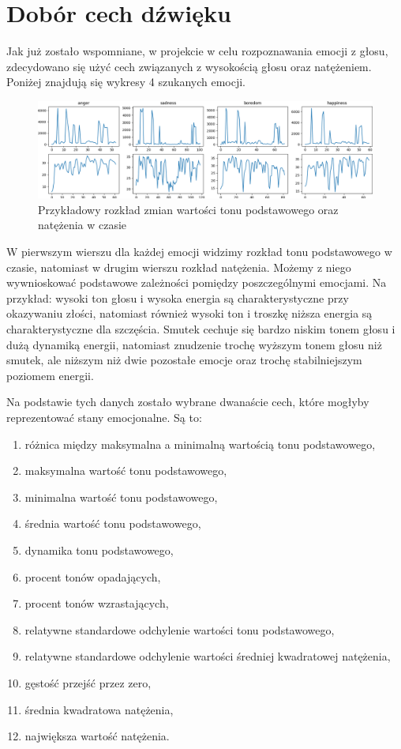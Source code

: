 \documentclass[declaration,shortabstract]{iithesis}
\begin{document}
\section{Dobór cech dźwięku}
Jak już zostało wspomniane, w projekcie w celu rozpoznawania emocji z głosu, zdecydowano się użyć cech związanych z wysokością głosu oraz natężeniem. Poniżej znajdują się wykresy 4 szukanych emocji.

\begin{figure}[!ht]
\hspace*{-2cm}  
	\caption{Przykładowy rozkład zmian wartości tonu podstawowego oraz natężenia w czasie}
	\includegraphics[scale=0.3]{b01.png}
\end{figure}
	
W pierwszym wierszu dla każdej emocji widzimy rozkład tonu podstawowego w czasie, natomiast w drugim wierszu rozkład natężenia. Możemy z niego wywnioskować podstawowe zależności pomiędzy poszczególnymi emocjami. Na przykład: wysoki ton głosu i wysoka energia są charakterystyczne  przy okazywaniu złości, natomiast również wysoki ton i troszkę niższa energia są charakterystyczne dla szczęścia. Smutek cechuje się bardzo niskim tonem głosu i dużą dynamiką energii, natomiast znudzenie trochę wyższym tonem głosu niż smutek, ale niższym niż dwie pozostałe emocje oraz trochę stabilniejszym poziomem energii. 

Na podstawie tych danych zostało wybrane dwanaście cech, które mogłyby reprezentować stany emocjonalne.
Są to: 
\begin{enumerate}
\item różnica między maksymalna a minimalną wartością tonu podstawowego,
\item maksymalna wartość tonu podstawowego,
\item minimalna wartość tonu podstawowego,
\item średnia wartość tonu podstawowego,
\item dynamika tonu podstawowego,
\item procent tonów opadających,
\item procent tonów wzrastających,
\item relatywne standardowe odchylenie wartości tonu podstawowego,
\item relatywne standardowe odchylenie wartości średniej kwadratowej natężenia,
\item gęstość przejść przez zero,
\item średnia kwadratowa natężenia,
\item największa wartość natężenia.
\end{enumerate}
\end{document}
